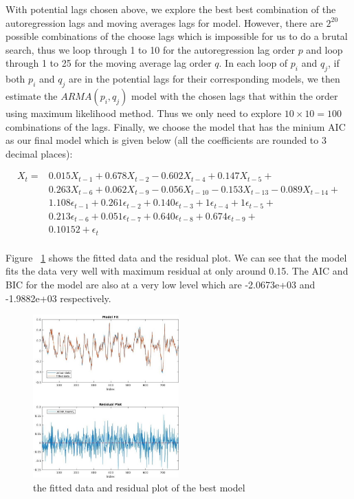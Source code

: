 \documentclass{article}
\begin{document}
With potential lags chosen above, we explore the best best combination of the autoregression lags and moving averages lags for model. However, there are $2^{20}$ possible combinations of the choose lags which is impossible for us to do a brutal search, thus we loop through 1 to 10 for the autoregression lag order $p$ and loop through 1 to 25 for the moving average lag order $q$. In each loop of $p_i$ and $q_j$, if both $p_i$ and $q_j$ are in the potential lags for their corresponding models, we then estimate the $ARMA(p_i, q_j)$ model with the chosen lags that within the order using maximum likelihood method. Thus we only need to explore $10\times10=100$ combinations of the lags. Finally, we choose the model that has the minium AIC as our final model which is given below (all the coefficients are rounded to 3 decimal places):

\begin{align*}
    X_t=&0.015X_{t-1}+0.678X_{t-2}-0.602X_{t-4}+0.147X_{t-5}+\\
        &0.263X_{t-6}+0.062X_{t-9}-0.056X_{t-10}-0.153X_{t-13}-0.089X_{t-14}+\\
        &1.108\epsilon_{t-1}+0.261\epsilon_{t-2}+0.140\epsilon_{t-3}+1\epsilon_{t-4}+1\epsilon_{t-5}+\\
        &0.213\epsilon_{t-6}+0.051\epsilon_{t-7}+0.640\epsilon_{t-8}+0.674\epsilon_{t-9}+\\
        &0.10152+\epsilon_t\\
\end{align*}

Figure ~\ref{fig:fit} shows the fitted data and the residual plot. We can see that the model fits the data very well with maximum residual at only around 0.15. The AIC and BIC for the model are also at a very low level which are -2.0673e+03 and -1.9882e+03 respectively.

\begin{figure}[h!]
    \centering
    \includegraphics[width=0.5\textwidth]{fit.jpg}
    \caption{the fitted data and residual plot of the best model}
    \label{fig:fit}
\end{figure}
\end{document}
